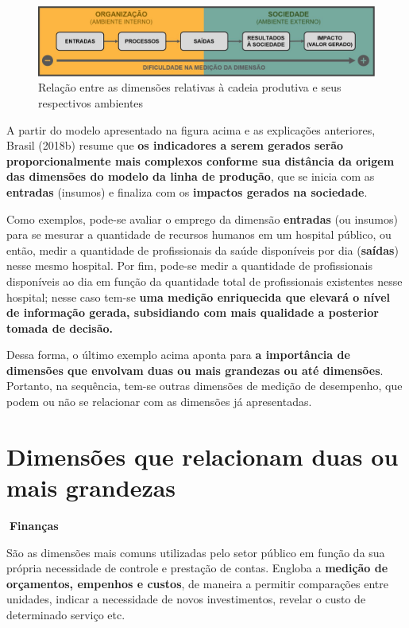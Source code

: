 \documentclass[
  letterpaper,
  DIV=11,
  numbers=noendperiod]{scrreprt}
\begin{document}
\begin{figure}

{\centering \includegraphics{images/dimensoes_cadeia_prodXambiente.JPG}

}

\caption{Relação entre as dimensões relativas à cadeia produtiva e seus
respectivos ambientes}

\end{figure}

A partir do modelo apresentado na figura acima e as explicações
anteriores, Brasil (2018b) resume que {\textbf{os indicadores a serem
gerados serão proporcionalmente mais complexos conforme sua distância da
origem das dimensões do modelo da linha de produção}}, que se inicia com
as \textbf{entradas} (insumos) e finaliza com os \textbf{impactos
gerados na sociedade}.

Como exemplos, pode-se avaliar o emprego da dimensão \textbf{entradas}
(ou insumos) para se mesurar a quantidade de recursos humanos em um
hospital público, ou então, medir a quantidade de profissionais da saúde
disponíveis por dia (\textbf{saídas}) nesse mesmo hospital. Por fim,
pode-se medir a quantidade de profissionais disponíveis ao dia em função
da quantidade total de profissionais existentes nesse hospital; nesse
caso tem-se {\textbf{uma medição enriquecida que elevará o nível de
informação gerada, subsidiando com mais qualidade a posterior tomada de
decisão.}}

Dessa forma, o último exemplo acima aponta para \textbf{a importância de
dimensões que envolvam duas ou mais grandezas ou até dimensões}.
Portanto, na sequência, tem-se outras dimensões de medição de
desempenho, que podem ou não se relacionar com as dimensões já
apresentadas.

\hypertarget{dimensuxf5es-que-relacionam-duas-ou-mais-grandezas}{%
\section{Dimensões que relacionam duas ou mais
grandezas}\label{dimensuxf5es-que-relacionam-duas-ou-mais-grandezas}}

\begin{tcolorbox}[enhanced jigsaw, bottomrule=.15mm, arc=.35mm, breakable, toprule=.15mm, rightrule=.15mm, opacityback=0, left=2mm, colback=white, leftrule=.75mm]

\textbf{🔽{Finanças}}\vspace{2mm}

São as dimensões mais comuns utilizadas pelo setor público em função da
sua própria necessidade de controle e prestação de contas. Engloba a
\textbf{medição de orçamentos, empenhos e custos}, de maneira a permitir
comparações entre unidades, indicar a necessidade de novos
investimentos, revelar o custo de determinado serviço etc.

\end{tcolorbox}
\end{document}
